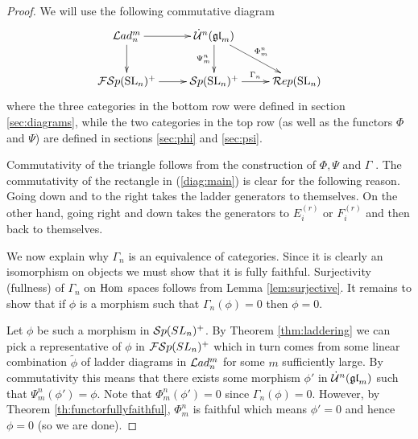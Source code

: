 \documentclass[10pt,leqno]{article}
\begin{document}
\begin{proof}
We will use the following commutative diagram
\begin{equation}\label{diag:main}
\xymatrix{
\Lad_n^m \ar[r] \ar[d] & \dU^n(\gl_m) \ar[dr]^{\Phi_m^n} \ar[d]_{\Psi_m^n} & \\
\FSp(\SL_n)^+ \ar[r] & \Sp(\SL_n)^+ \ar[r]^{\Gamma_n} & \Rep(\SL_n) \\
}
\end{equation}
where the three categories in the bottom row were defined in section \ref{sec:diagrams}, while the two categories in the top row (as well as the functors $\Phi$ and $\Psi$) are defined in sections \ref{sec:phi} and \ref{sec:psi}. 

Commutativity of the triangle follows from the construction of $\Phi,\Psi$ and $\Gamma$ . The commutativity of the rectangle in (\ref{diag:main}) is clear for the following reason. Going down and to the right takes the ladder generators to themselves. On the other hand, going right and down takes the generators to $E_i^{(r)}$ or $F_i^{(r)}$ and then back to themselves. 

We now explain why $\Gamma_n$ is an equivalence of categories. Since it is clearly an isomorphism on objects we must show that it is fully faithful. Surjectivity (fullness) of $\Gamma_n$ on $\operatorname{Hom}$ spaces follows from Lemma \ref{lem:surjective}. It remains to show that if $\phi$ is a morphism such that $\Gamma_n(\phi)=0$ then $\phi=0$. 

Let $\phi$ be such a morphism in ${\mathcal{S}p}(SL_n)^+$. By Theorem \ref{thm:laddering} we can pick a representative of $\phi$ in ${\mathcal{FS}p}(SL_n)^+$ which in turn comes from some linear combination $\tilde{\phi}$ of ladder diagrams in $\mathcal{L}ad_n^m$ for some $m$ sufficiently large. By commutativity this means that there exists some morphism $\phi'$ in $\dot{{\mathcal{U}}}^n({\mathfrak{gl}}_m)$ such that $\Psi_m^n(\phi')=\phi$. Note that $\Phi^n_m(\phi')=0$ since $\Gamma_n(\phi)=0$. However, by Theorem \ref{th:functorfullyfaithful}, $\Phi_m^n$ is faithful which means $\phi'=0$ and hence $\phi=0$ (so we are done). 



\end{proof}
\end{document}
